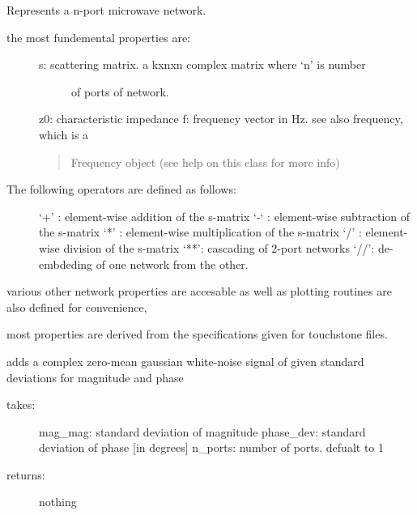 \documentclass[letterpaper,10pt,english]{sphinxmanual}
\begin{document}
\begin{fulllineitems}
\label{auto_network:mwavepy.Network}
Represents a n-port microwave network.
\begin{description}
\item[{the most fundemental properties are:}] \leavevmode\begin{description}
\item[{s: scattering matrix. a kxnxn complex matrix where `n' is number}] \leavevmode
of ports of network.

\end{description}

z0: characteristic impedance
f: frequency vector in Hz. see also frequency, which is a
\begin{quote}

Frequency object (see help on this class for more info)
\end{quote}

\item[{The following operators are defined as follows:}] \leavevmode
`+' : element-wise addition of the s-matrix
`-` : element-wise subtraction of the s-matrix
`*' : element-wise multiplication of the s-matrix
`/' : element-wise division of the s-matrix
`**': cascading of 2-port networks
`//': de-embdeding of one network from the other.

\end{description}

various other network properties are accesable as well as plotting
routines are also defined for convenience,

most properties are derived from the specifications given for
touchstone files.

\begin{fulllineitems}
\label{auto_network:mwavepy.Network.add_noise_polar}
adds a complex zero-mean gaussian white-noise signal of given
standard deviations for magnitude and phase
\begin{description}
\item[{takes:}] \leavevmode
mag\_mag: standard deviation of magnitude
phase\_dev: standard deviation of phase {[}in degrees{]}
n\_ports: number of ports. defualt to 1

\item[{returns:}] \leavevmode
nothing


\end{description}
\end{fulllineitems}
\end{fulllineitems}
\end{document}
